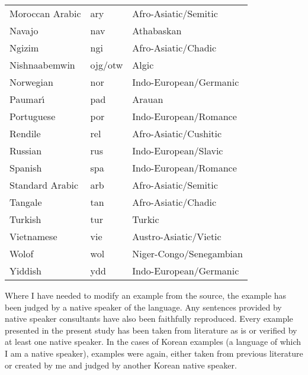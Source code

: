 \begin{table}[h]
\begin{tabular*}{.9\textwidth}{lll}
Moroccan Arabic & ary & Afro-Asiatic/Semitic \\ 
Navajo & nav & Athabaskan \\ 
Ngizim & ngi & Afro-Asiatic/Chadic \\ 
Nishnaabemwin & ojg/otw & Algic \\ 
Norwegian & nor & Indo-European/Germanic \\ 
Paumar{\'{\i}} & pad & Arauan \\ 
Portuguese & por & Indo-European/Romance \\ 
Rendile & rel & Afro-Asiatic/Cushitic \\ 
Russian & rus & Indo-European/Slavic \\ 
Spanish & spa & Indo-European/Romance \\ 
Standard Arabic & arb & Afro-Asiatic/Semitic \\ 
Tangale & tan & Afro-Asiatic/Chadic \\ 
Turkish & tur & Turkic \\ 
Vietnamese & vie & Austro-Asiatic/Vietic \\ 
Wolof & wol & Niger-Congo/Senegambian \\ 
Yiddish & ydd & Indo-European/Germanic \\ 
\hline
\hline
\end{tabular*}
\end{table}


Where I have needed to modify an example from the source, the example
has been judged by a native speaker of the language.  Any sentences
provided by native speaker consultants have also been faithfully
reproduced.  Every example presented in the present study has been
taken from literature as is or verified by at least one native
speaker. In the cases of Korean examples (a language of which I am a
native speaker), examples were again, either taken from previous
literature or created by me and judged by another Korean native
speaker.


